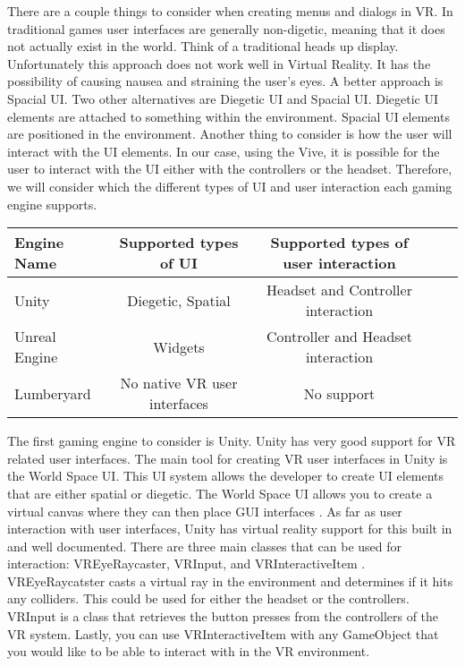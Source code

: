 \documentclass[10pt,journal,compsoc,onecolumn, draftclsnofoot]{IEEEtran}
\begin{document}
There are a couple things to consider when creating menus and dialogs in VR.
In traditional games user interfaces are generally non-digetic, meaning that it does not actually exist in the world.
Think of a traditional heads up display.
Unfortunately this approach does not work well in Virtual Reality.
It has the possibility of causing nausea and straining the user's eyes.
A better approach is Spacial UI.
Two other alternatives are Diegetic UI and Spacial UI.
Diegetic UI elements are attached to something within the environment.
Spacial UI elements are positioned in the environment.
Another thing to consider is how the user will interact with the UI elements.
In our case, using the Vive, it is possible for the user to interact with the UI either with the controllers or the headset.
Therefore, we will consider which the different types of UI and user interaction each gaming engine supports.

\vspace{2mm}
\begin{table}[h!]
\centering
  \begin{tabular}{ | l || c | c | c | c |  }
  \hline
  Engine Name & Supported types of UI & Supported types of user interaction \\
  \hline
  Unity & Diegetic, Spatial &  Headset and Controller interaction\\ \hline
  Unreal Engine & Widgets & Controller and Headset interaction\\ \hline
  Lumberyard & No native VR user interfaces & No support\\ \hline
  \hline
  \end{tabular}
\end{table}
\vspace{2mm}

The first gaming engine to consider is Unity.
Unity has very good support for VR related user interfaces.
The main tool for creating VR user interfaces in Unity is the World Space UI.
This UI system allows the developer to create UI elements that are either spatial or diegetic.
The World Space UI allows you to create a virtual canvas where they can then place GUI interfaces \cite{unity_world_space}.
As far as user interaction with user interfaces, Unity has virtual reality support for this built in and well documented.
There are three main classes that can be used for interaction: VREyeRaycaster, VRInput, and VRInteractiveItem \cite{unity_interface_interaction}.
VREyeRaycatster casts a virtual ray in the environment and determines if it hits any colliders.
This could be used for either the headset or the controllers.
VRInput is a class that retrieves the button presses from the controllers of the VR system.
Lastly, you can use VRInteractiveItem with any GameObject that you would like to be able to interact with in the VR environment.
\end{document}
